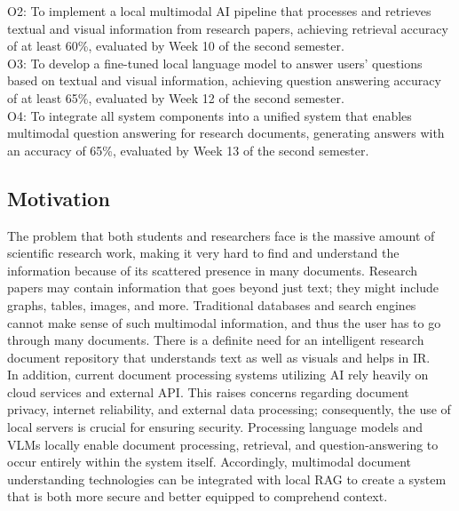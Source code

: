 \documentclass[11pt,a4paper]{report}
\begin{document}
O2: To implement a local multimodal \ac{AI} pipeline that processes and retrieves textual and visual information from research papers, achieving retrieval accuracy of at least 60\%, evaluated by Week 10 of the second semester.\\

O3: To develop a fine-tuned local language model to answer users’ questions based on textual and visual information, achieving question answering accuracy of at least 65\%, evaluated by Week 12 of the second semester.\\

O4: To integrate all system components into a unified system that enables multimodal question answering for research documents, generating answers with an accuracy of 65\%, evaluated by Week 13 of the second semester.

\subsection{Motivation}
The problem that both students and researchers face is the massive amount of scientific research work, making it very hard to find and understand the information because of its scattered presence in many documents. Research papers may contain information that goes beyond just text; they might include graphs, tables, images, and more. Traditional databases and search engines cannot make sense of such multimodal information, and thus the user has to go through many documents. There is a definite need for an intelligent research document repository that understands text as well as visuals and helps in \ac{IR}.\\

In addition, current document processing systems utilizing \ac{AI} rely heavily on cloud services and external \ac{API}. This raises concerns regarding document privacy, internet reliability, and external data processing; consequently, the use of local servers is crucial for ensuring security. Processing language models and \acp{VLM} locally enable document processing, retrieval, and question-answering to occur entirely within the system itself. Accordingly, multimodal document understanding technologies can be integrated with local \ac{RAG} to create a system that is both more secure and better equipped to comprehend context.
\end{document}

